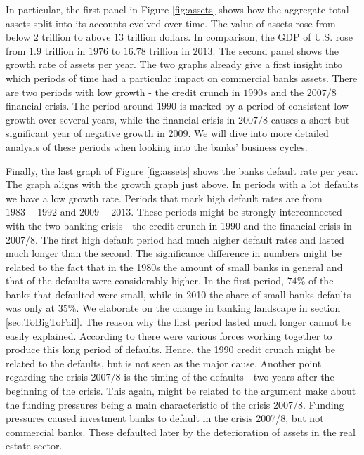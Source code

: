 \documentclass[12pt, a4paper]{article} %
\begin{document}
 
In particular, the first panel in Figure \ref{fig:assets} shows how the aggregate total assets split into its accounts evolved over time. The value of assets rose from below $2$ trillion to above $13$ trillion dollars. In comparison, the GDP of U.S. rose from $1.9$ trillion in $1976$ to $16.78$ trillion in $2013$. %
The second panel shows the growth rate of assets per year. 
The two graphs already give a first insight into which periods of time had a particular impact on commercial banks assets. There are two periods with low growth - the credit crunch in $1990s$ and the $2007/8$ financial crisis. The period around $1990$ is marked by a period of consistent low growth over several years, while the financial crisis in $2007/8$ causes a short but significant year of negative growth in $2009$. We will dive into more detailed analysis of these periods when looking into the banks' business cycles.
  


\iffalse
Finally, the last graph of Figure \ref{fig:assets} shows the banks default rate per year. The graph aligns with the growth graph just above. In periods with a lot defaults we have a low growth rate. Periods that mark high default rates are from $1983-1992$ and $2009-2013$. These periods might be strongly interconnected with the two banking crisis - the credit crunch in 1990 and the financial crisis in 2007/8. The first high default period had much higher default rates and lasted much longer than the second.
The significance difference in numbers might be related to the fact that in the 1980s the amount of small banks in general and that of the defaults were considerably higher.  In the first period, $74\%$ of the banks that defaulted were small, while in 2010 the share of small banks defaults was only at $35\%$. We elaborate on the change in banking landscape in section \ref{sec:ToBigToFail}. The reason why the first period lasted much longer cannot be easily explained. According to \citet{federal1997history} there were various forces working together to produce this long period of defaults. Hence, the 1990 credit crunch might be related to the defaults, but is not seen as the major cause.
Another point regarding the crisis 2007/8 is the timing of the defaults - two years after the beginning of the crisis. This again, might be related to the argument \citet{antoniades2019commercial} make about the funding pressures being a main characteristic of the crisis 2007/8. Funding pressures caused investment banks to default in the crisis 2007/8, but not commercial banks. These defaulted later by the deterioration of assets in the real estate sector.
\end{document}
